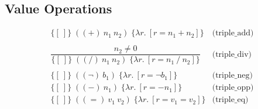 \documentclass[10pt,a4paper]{article}
\newcommand{\emp}{[\: ]} %
\newcommand{\triple}[3]{\{#2\}\;#1\;\{#3\}}
\newcommand{\valint}[1]{#1}
\newcommand{\valbool}[1]{#1}
\newcommand{\isTrue}[1]{#1}
\newcommand{\Zquot}[2]{#1 \mathbin{/} #2}
\newcommand{\fun}[2]{\lambda #1.~#2}
\begin{document}
\begin{multicols}{2}


\section*{Value Operations}
\[
\begin{array}{cl}
  \triple{((+)~n_1~n_2)}{\emp}{\fun{r}{[r = \valint{n_1 + n_2}]}} & \text{(triple\_add)} \\
\\
  \dfrac{n_2 \neq 0}
  {\triple{((/)~n_1~n_2)}{\emp}{\fun{r}{[r = \valint{\Zquot{n_1}{n_2}}]}}} & \text{(triple\_div)} \\
  \\
  \triple{((\neg)~b_1)}{\emp}{\fun{r}{[r = \valbool{\neg b_1}]}} & \text{(triple\_neg)} \\
  \triple{((-)~n_1)}{\emp}{\fun{r}{[r = \valint{-n_1}]}} & \text{(triple\_opp)} \\
  \triple{((=)~v_1~v_2)}{\emp}{\fun{r}{[r = \isTrue{v_1 = v_2}]}} & \text{(triple\_eq)} \\


\end{array}\]
\end{multicols}
\end{document}
